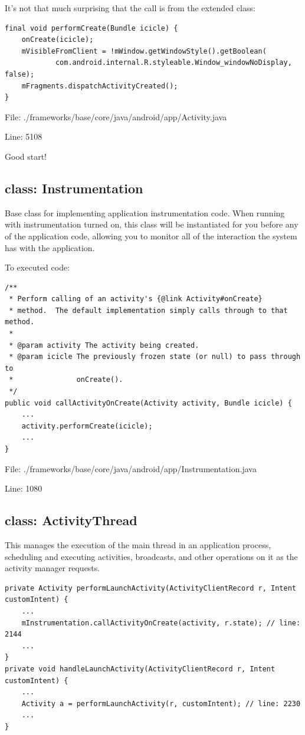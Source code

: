 \documentclass[11pt,a4paper]{article}
\begin{document}
It's not that much surprising that the call is from the extended class:
\scriptsize\begin{verbatim}
final void performCreate(Bundle icicle) {
    onCreate(icicle);
    mVisibleFromClient = !mWindow.getWindowStyle().getBoolean(
            com.android.internal.R.styleable.Window_windowNoDisplay, false);
    mFragments.dispatchActivityCreated();
}
\end{verbatim}
\normalsize

File: ./frameworks/base/core/java/android/app/Activity.java

Line: 5108

Good start!

\subsection{class: Instrumentation}

Base class for implementing application instrumentation code.  When running with instrumentation turned on, this class will be instantiated for you before any of the application code, allowing you to monitor all of the interaction the system has with the application.

To executed code:
\scriptsize
\begin{verbatim}
/**
 * Perform calling of an activity's {@link Activity#onCreate}
 * method.  The default implementation simply calls through to that method.
 * 
 * @param activity The activity being created.
 * @param icicle The previously frozen state (or null) to pass through to
 *               onCreate().
 */
public void callActivityOnCreate(Activity activity, Bundle icicle) { 
    ...
    activity.performCreate(icicle);
    ...    
}
\end{verbatim}
\normalsize

File: ./frameworks/base/core/java/android/app/Instrumentation.java

Line: 1080

\subsection{class: ActivityThread}

This manages the execution of the main thread in an application process, scheduling and executing activities, broadcasts, and other operations on it as the activity manager requests.

\scriptsize
\begin{verbatim}
private Activity performLaunchActivity(ActivityClientRecord r, Intent customIntent) {
    ...
    mInstrumentation.callActivityOnCreate(activity, r.state); // line: 2144
    ...
}
private void handleLaunchActivity(ActivityClientRecord r, Intent customIntent) {
    ...
    Activity a = performLaunchActivity(r, customIntent); // line: 2230
    ...
}
\end{verbatim}
\normalsize
\end{document}
